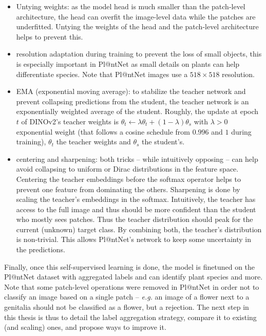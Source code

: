 \begin{itemize}
    \item Untying weights: as the model head is much smaller than the patch-level architecture, the head can overfit the image-level data while the patches are underfitted. Untying the weights of the head and the patch-level architecture helps to prevent this.
    \item resolution adaptation during training to prevent the loss of small objects, this is especially important in Pl@ntNet as small details on plants can help differentiate species. Note that Pl@ntNet images use a $518\times 518$ resolution.
    \item EMA (exponential moving average): to stabilize the teacher network and prevent collapsing predictions from the student, the teacher network is an exponentially weighted average of the student. Roughly, the update at epoch $t$ of DINOv2's teacher weights is $\theta_t \gets \lambda \theta_t + (1-\lambda)\theta_{s}$ with $\lambda>0$ exponential weight (that follows a cosine schedule from $0.996$ and $1$ during training), $\theta_t$ the teacher weights and $\theta_s$ the student's.
    \item centering and sharpening: both tricks -- while intuitively opposing -- can help avoid collapsing to uniform or Dirac distributions in the feature space. Centering the teacher embeddings before the softmax operator helps to prevent one feature from dominating the others. Sharpening is done by scaling the teacher's embeddings in the softmax. Intuitively, the teacher has access to the full image and thus should be more confident than the student who mostly sees patches. Thus the teacher distribution should peak for the current (unknown) target class. By combining both, the teacher's distribution is non-trivial. This allows Pl@ntNet's network to keep some uncertainty in the predictions.
\end{itemize}

Finally, once this self-supervised learning is done, the model is finetuned on the Pl@ntNet dataset with aggregated labels and can identify plant species and more.
Note that some patch-level operations were removed in Pl@ntNet in order not to classify an image based on a single patch -- \emph{e.g.} an image of a flower next to a genitalia should not be classified as a flower, but a rejection.
The next step in this thesis is thus to detail the label aggregation strategy, compare it to existing (and scaling) ones, and propose ways to improve it.

